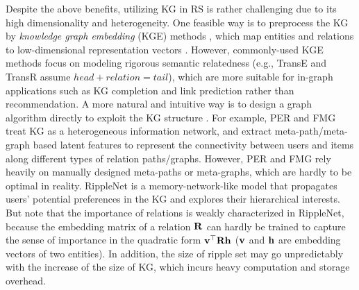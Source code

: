 \documentclass[sigconf]{acmart}
\begin{document}
	Despite the above benefits, utilizing KG in RS is rather challenging due to its high dimensionality and heterogeneity.
	One feasible way is to preprocess the KG by \textit{knowledge graph embedding} (KGE) methods \cite{wang2017knowledge}, which map entities and relations to low-dimensional representation vectors \cite{zhang2016collaborative,wang2018dkn,huang2018improving}.
	However, commonly-used KGE methods focus on modeling rigorous semantic relatedness (e.g., TransE \cite{bordes2013translating} and TransR \cite{lin2015learning} assume $head + relation = tail$), which are more suitable for in-graph applications such as KG completion and link prediction rather than recommendation.
	A more natural and intuitive way is to design a graph algorithm directly to exploit the KG structure \cite{yu2014personalized,zhao2017meta,wang2018ripple}.
	For example, PER \cite{yu2014personalized} and FMG \cite{zhao2017meta} treat KG as a heterogeneous information network, and extract meta-path/meta-graph based latent features to represent the connectivity between users and items along different types of relation paths/graphs.
	However, PER and FMG rely heavily on manually designed meta-paths or meta-graphs, which are hardly to be optimal in reality.
	RippleNet \cite{wang2018ripple} is a memory-network-like model that propagates users' potential preferences in the KG and explores their hierarchical interests.
	But note that the importance of relations is weakly characterized in RippleNet, because the embedding matrix of a relation $\bf R$ can hardly be trained to capture the sense of importance in the quadratic form ${\bf v}^\top {\bf R} {\bf h}$ ($\bf v$ and $\bf h$ are embedding vectors of two entities).
	In addition, the size of ripple set may go unpredictably with the increase of the size of KG, which incurs heavy computation and storage overhead.
	
\end{document}
